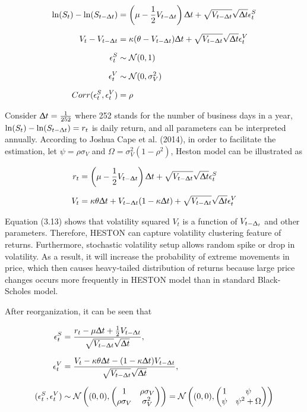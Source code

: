 \documentclass[12pt,a4paper]{article}
\numberwithin{equation}{section}
\begin{document}
\begin{align*}
\ln(S_t) - \ln(S_{t-\Updelta t}) &= \left( \mu - \frac{1}{2}V_{t-\Updelta t} \right) \Updelta t+ \sqrt{V_{t - \Updelta t}} \sqrt{\Updelta t} \epsilon_t^S\\[0.6em]
V_t - V_{t-\Updelta t} &= \kappa (\theta - V_{t- \Updelta t}) \Updelta t + \sqrt{V_{t - \Updelta t}} \sqrt{\Updelta t} \epsilon_t^V \\[0.6em] 
\epsilon_t^S &\sim \mathcal{N}(0, 1)\\[0.6em]
\epsilon_t^V &\sim \mathcal{N}(0, \sigma_V^2)\\[0.6em]
Corr(\epsilon_t^S, \epsilon_t^V) &= \rho
\end{align*}

Consider $\Updelta t = \frac{1}{252}$ where 252 stands for the number of business days in a year, $\ln(S_t) - \ln(S_{t-\Updelta t}) = r_t$ is daily return, and all parameters can be interpreted annually. According to Joshua Cape et al. (2014), in order to facilitate the estimation, let $\psi = \rho \sigma_V$ and $\Omega = \sigma_V^2(1-\rho^2)$, Heston model can be illustrated as 

 \begin{align}
r_t &= \left( \mu - \frac{1}{2}V_{t-\Updelta t} \right) \Updelta t+ \sqrt{V_{t - \Updelta t}} \sqrt{\Updelta t} \epsilon_t^S \label{eq:3.12} \\[0.6em] 
V_t &= \kappa \theta \Updelta t + V_{t- \Updelta t} (1 - \kappa \Updelta t)  + \sqrt{V_{t - \Updelta t}} \sqrt{\Updelta t} \epsilon_t^V \label{eq:3.13}
\end{align}

Equation (3.13) shows that volatility squared $V_t$ is a function of $V_{t-\Updelta_t}$ and other parameters. Therefore, HESTON can capture volatility clustering feature of returns. Furthermore, stochastic volatility setup allows random spike or drop in volatility. As a result, it will increase the probability of extreme movements in price, which then causes heavy-tailed distribution of returns because large price changes occurs more frequently in HESTON model than in standard Black-Scholes model. 

After reorganization, it can be seen that

\begin{align*}
\epsilon_t^S &= \frac{r_t - \mu \Updelta t + \frac{1}{2} V_{t-\Updelta t}}{\sqrt{V_{t-\Updelta t}}\sqrt{\Updelta t}}, \\[0.6em]
\epsilon_t^V &= \frac{V_t - \kappa \theta \Updelta t - (1-\kappa \Updelta t) V_{t-\Updelta t}}{\sqrt{V_{t-\Updelta t}}\sqrt{\Updelta t}},\\[0.6em]
(\epsilon_t^S, \epsilon_t^V) &\sim \mathcal{N}\left( (0,0), \begin{pmatrix}
											1 & \rho \sigma_V\\
											\rho \sigma_V & \sigma_V^2
										    \end{pmatrix} \right) = \mathcal{N} \left((0,0) , \begin{pmatrix}
																				1 & \psi \\
																				\psi  & \psi^2 + \Omega
										    									  \end{pmatrix} \right)
\end{align*}
\end{document}

